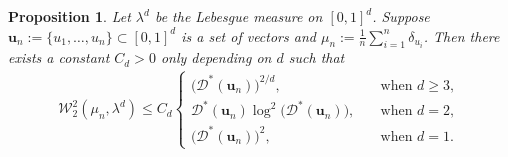 \documentclass[11pt]{article}
\newtheorem{prop}[thm]{Proposition}
\newcommand{\bs}[1]{\boldsymbol{#1}}
\begin{document}
\begin{prop}\label{prop:WassBoundbyStar}
Let $\lambda^d$ be the Lebesgue measure on $[0, 1]^d$. Suppose ${\bs u}_n:= \{u_1, \ldots, u_n\} \subset [0, 1]^d$ is a set of vectors and $\mu_n := \frac{1}{n}\sum_{i = 1}^n \delta_{u_i}$. Then there exists a constant $C_d>0$ only depending on $d$ such that 
\begin{align*}
\mathcal{W}_2^2(\mu_n, \lambda^d) \leq C_d \begin{cases}
\bigl(\mathcal{D}^*({\bs u}_n)\bigr)^{2/d}, \quad &\text{when $d \geq 3$}, \\ 
 \mathcal{D}^*({\bs u}_n) \log^2 \bigl(\mathcal{D}^*({\bs u}_n)\bigr), \quad &\text{when $d = 2$}, \\ 
 \bigl(\mathcal{D}^*({\bs u_n})\bigr)^2, \quad &\text{when $d =1$}.
  \end{cases}
\end{align*}
\end{prop}
\end{document}
